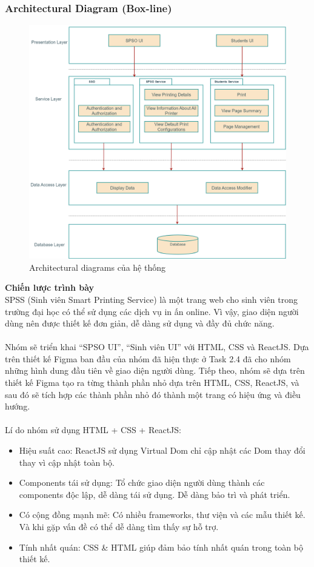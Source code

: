 \documentclass[a4paper]{article}
\begin{document}
\subsubsection{Architectural Diagram (Box-line)}
\begin{figure}[h!]
\begin{center}
\includegraphics[width=14cm]{picture/_layered architecture.drawio.png}
\caption{Architectural diagrams của hệ thống}
\end{center}
\end{figure}
\newpage
\noindent \textbf{Chiến lược trình bày}\\
SPSS (Sinh viên Smart Printing Service) là một trang web cho sinh viên trong trường đại học có thể sử dụng các dịch vụ in ấn online. Vì vậy, giao diện người dùng nên được thiết kế đơn giản, dễ dàng sử dụng và đầy đủ chức năng.\\
\\
Nhóm sẽ triển khai “SPSO UI”, “Sinh viên UI” với HTML, CSS và ReactJS. Dựa trên thiết kế Figma ban đầu của nhóm đã hiện thực ở Task 2.4 đã cho nhóm những hình dung đầu tiên về giao diện người dùng. Tiếp theo, nhóm sẽ dựa trên thiết kế Figma tạo ra từng thành phần nhỏ dựa trên HTML, CSS, ReactJS, và sau đó sẽ tích hợp các thành phần nhỏ đó thành một trang có hiệu ứng và điều hướng.\\
\\
Lí do nhóm sử dụng HTML + CSS + ReactJS: 
\begin{itemize}
    \item Hiệu suất cao: ReactJS sử dụng Virtual Dom chỉ cập nhật các Dom thay đổi thay vì cập nhật toàn bộ.
    \item Components tái sử dụng: Tổ chức giao diện người dùng thành các components độc lập, dễ dàng tái sử dụng. Dễ dàng bảo trì và phát triển.
    \item Có cộng đồng mạnh mẽ: Có nhiều frameworks, thư viện và các mẫu thiết kế. Và khi gặp vấn đề có thể dễ dàng tìm thấy sự hỗ trợ.
    \item Tính nhất quán: CSS  \& HTML giúp đảm bảo tính nhất quán trong toàn bộ thiết kế.
\end{itemize}
\end{document}
